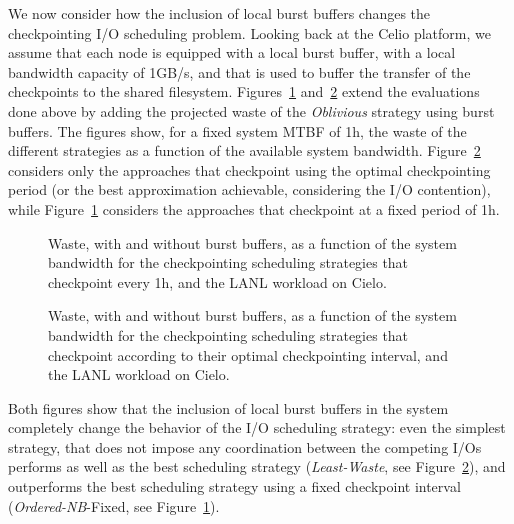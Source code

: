 \documentclass[two]{article}
\newcommand{\nocoop}{\emph{Oblivious}\xspace}
\newcommand{\fifononblock}{\emph{Ordered-NB}\xspace}
\newcommand{\leastwaste}{\emph{Least-Waste}\xspace}
\def\fifofixed{\fifononblock-Fixed\xspace}
\def\cooperative{\leastwaste}
\begin{document}
We now consider how the inclusion of local burst buffers changes the
checkpointing I/O scheduling problem. Looking back at the Celio
platform, we assume that each node is equipped with a local burst
buffer, with a local bandwidth capacity of 1GB/s, and that is used to
buffer the transfer of the checkpoints to the shared
filesystem. Figures~\ref{fig:bb:avsysbw:fixed}
and~\ref{fig:bb:avsysbw:daly} extend the evaluations done above by
adding the projected waste of the \nocoop strategy using burst
buffers. The figures show, for a fixed system MTBF of 1h, the waste of
the different strategies as a function of the available system
bandwidth. Figure~\ref{fig:bb:avsysbw:daly} considers only the
approaches that checkpoint using the optimal checkpointing period (or
the best approximation achievable, considering the I/O contention),
while Figure~\ref{fig:bb:avsysbw:fixed} considers the approaches that
checkpoint at a fixed period of 1h.

\begin{figure}
  \begin{center}
    \resizebox{1.05\linewidth}{!}{}
  \end{center}
  \caption{Waste, with and without burst buffers, as a function of the system bandwidth for the
    checkpointing scheduling strategies
    that checkpoint every 1h, and the LANL workload on
    Cielo.\label{fig:bb:avsysbw:fixed}}
\end{figure}

\begin{figure}
  \begin{center}
    \resizebox{1.05\linewidth}{!}{}
  \end{center}
  \caption{Waste, with and without burst buffers, as a function of the system bandwidth for the
    checkpointing scheduling strategies 
    that checkpoint according to their optimal checkpointing interval,
    and the LANL workload on Cielo. \label{fig:bb:avsysbw:daly}}
\end{figure}

Both figures show that the inclusion of local burst buffers in the system
completely change the behavior of the I/O scheduling strategy: even
the simplest strategy, that does not impose any coordination between
the competing I/Os performs as well as the best scheduling strategy
(\cooperative, see Figure~\ref{fig:bb:avsysbw:daly}), and outperforms
the best scheduling strategy using a fixed checkpoint interval
(\fifofixed, see Figure~\ref{fig:bb:avsysbw:fixed}).
\end{document}

